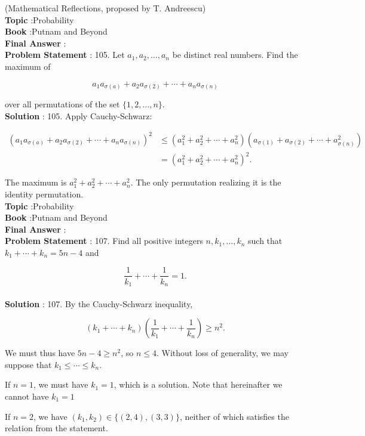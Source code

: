 \documentclass[10pt]{article}
\begin{document}
(Mathematical Reflections, proposed by T. Andreescu)
\\
\textbf{Topic} :Probability\\
\textbf{Book} :Putnam and Beyond\\
\textbf{Final Answer} :\\


\textbf{Problem Statement} :
105. Let $a_{1}, a_{2}, \ldots, a_{n}$ be distinct real numbers. Find the maximum of

$$
a_{1} a_{\sigma(a)}+a_{2} a_{\sigma(2)}+\cdots+a_{n} a_{\sigma(n)}
$$

over all permutations of the set $\{1,2, \ldots, n\}$.
\\
\textbf{Solution} :
105. Apply Cauchy-Schwarz:

$$
\begin{aligned}
\left(a_{1} a_{\sigma(a)}+a_{2} a_{\sigma(2)}+\cdots+a_{n} a_{\sigma(n)}\right)^{2} & \leq\left(a_{1}^{2}+a_{2}^{2}+\cdots+a_{n}^{2}\right)\left(a_{\sigma(1)}+a_{\sigma(2)}+\cdots+a_{\sigma(n)}^{2}\right) \\
&=\left(a_{1}^{2}+a_{2}^{2}+\cdots+a_{n}^{2}\right)^{2} .
\end{aligned}
$$

The maximum is $a_{1}^{2}+a_{2}^{2}+\cdots+a_{n}^{2}$. The only permutation realizing it is the identity permutation.
\\
\textbf{Topic} :Probability\\
\textbf{Book} :Putnam and Beyond\\
\textbf{Final Answer} :\\


\textbf{Problem Statement} :
107. Find all positive integers $n, k_{1}, \ldots, k_{n}$ such that $k_{1}+\cdots+k_{n}=5 n-4$ and

$$
\frac{1}{k_{1}}+\cdots+\frac{1}{k_{n}}=1 .
$$
\\
\textbf{Solution} :
107. By the Cauchy-Schwarz inequality,

$$
\left(k_{1}+\cdots+k_{n}\right)\left(\frac{1}{k_{1}}+\cdots+\frac{1}{k_{n}}\right) \geq n^{2} .
$$

We must thus have $5 n-4 \geq n^{2}$, so $n \leq 4$. Without loss of generality, we may suppose that $k_{1} \leq \cdots \leq k_{n}$.

If $n=1$, we must have $k_{1}=1$, which is a solution. Note that hereinafter we cannot have $k_{1}=1$

If $n=2$, we have $\left(k_{1}, k_{2}\right) \in\{(2,4),(3,3)\}$, neither of which satisfies the relation from the statement.
\end{document}
